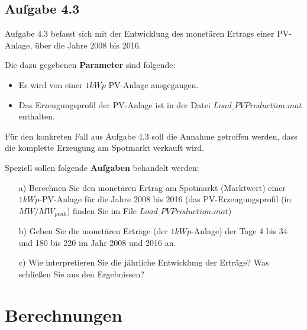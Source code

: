 \documentclass[a4paper,12pt]{article}
\begin{document}
	\subsection{Aufgabe 4.3}
	\label{sec:Aufgabenstellung43}
	Aufgabe 4.3 befasst sich mit der Entwicklung des monetären Ertrags einer PV-Anlage, über die Jahre 2008 bis 2016.\\ \par
	\noindent Die dazu gegebenen \textbf{Parameter} sind folgende:
	\begin{itemize}
		\item Es wird von einer $1kWp$ PV-Anlage ausgegangen.
		\item Das Erzeugungsprofil der PV-Anlage ist in der Datei $Load\_PVProduction.mat$ enthalten.
	\end{itemize}
	Für den konkreten Fall aus Aufgabe 4.3 soll die Annahme getroffen werden, dass die komplette Erzeugung am Spotmarkt verkauft wird.\\ \par
	\noindent Speziell sollen folgende \textbf{Aufgaben} behandelt werden:
	\begin{itemize}
		\item[a)] Berechnen Sie den monetären Ertrag am Spotmarkt (Marktwert) einer $1kWp$-PV-Anlage für die Jahre 2008 bis 2016 (das PV-Erzeugungsprofil (in $MW/MW_{peak}$) finden Sie im File $Load\_PVProduction.mat$)
		\item[b)] Geben Sie die monetären Erträge (der $1kWp$-Anlage) der Tage 4 bis 34 und 180 bis 220 im Jahr 2008 und 2016 an.
		\item[c)] Wie interpretieren Sie die jährliche Entwicklung der Erträge? Was schließen Sie aus den Ergebnissen?
	\end{itemize}
	\newpage
	\section{Berechnungen}
	\label{sec:Berechnungen}
\end{document}
